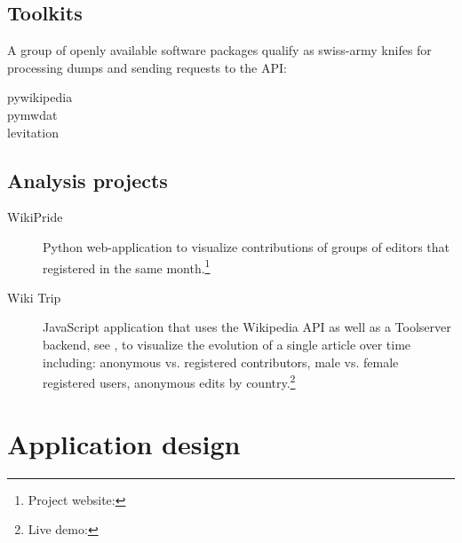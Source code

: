 \subsection{Toolkits}\label{sub:toolkits}

A group of openly available software packages qualify as swiss-army knifes for processing dumps and sending requests to the API:

\begin{description}
\item[pywikipedia] 
\item[pymwdat] 
\item[levitation] 
\end{description}

\subsection{Analysis projects}\label{sub:analysisprojects}


\begin{description}
\item[WikiPride] Python web-application  to visualize contributions of groups of editors that registered in the same month.\footnote{Project website: }
\item[Wiki Trip] JavaScript application that uses the Wikipedia API as well as a Toolserver backend, see , to visualize the evolution of a single article over time including: anonymous vs. registered contributors, male vs. female registered users, anonymous edits by country.\footnote{Live demo: } 
\end{description}


\section{Application design}

